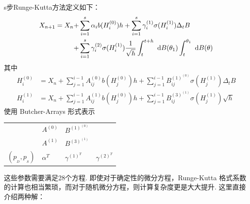 s步Runge-Kutta方法定义如下：
\begin{equation}\label{kutta}
\begin{aligned}
X_{n+1} = X_n + & \sum_{i=1}^s \alpha_i b(H_i^{(0)}) h + \sum_{i=1}^s\gamma_i^{(1)} \sigma(H_i^{(1)})\Delta_tB \\
+ & \sum_{i=1}^s \gamma_i^{(2)} \sigma(H_i^{(1)})\frac1{\sqrt h} \int_t^{t+h}\text{ d} B(\theta_1) \int_t^{\theta_1} \text{ d} B(\theta)
\end{aligned}
\end{equation}
其中
\[
\begin{aligned}
H_{i}^{(0)} &=X_{n}+\sum_{j=1}^{i-1} A_{i j}^{(0)} b\left(H_{j}^{(0)}\right) h+\sum_{j=1}^{i-1} B_{i j}^{(1)^{(0)}} \sigma\left(H_{j}^{(1)}\right) \Delta_tB \\
H_{i}^{(1)} &=X_{n}+\sum_{j=1}^{i-1} A_{i j}^{(1)} b\left(H_{j}^{(0)}\right) h+\sum_{j=1}^{i-1} B_{i j}^{(3)^{(1)}} \sigma\left(H_{j}^{(1)}\right) \sqrt{h}
\end{aligned}
\]
使用 Butcher-Arrays 形式表示 
\begin{table}[!htbp]
\centering
\begin{tabular}{p{1cm}<{\centering} | p{2cm}<{\centering} | p{2cm}<{\centering} |p{2cm}<{\centering}}
	\multirow{2}{*}{} & $A^{(0)}$ & $B^{(1)^{(0)}}$ & \\
	\cline{2-4}
	\rule{0pt}{13pt} & $A^{(1)}$ & $B^{(3)^{(1)}}$ & \\
	\hline
	\rule{0pt}{15pt} $(p_{_D} , p_{_S})$& $\alpha^T$ & $\gamma^{(1)^T}$ & $\gamma^{(2)^T}$\\
\end{tabular}
\end{table}
这些参数需要满足28个方程\cite{book_kutta}. 
即使对于确定性的微分方程，Runge-Kutta 格式系数的计算也相当繁琐，而对于随机微分方程，则计算复杂度更是大大提升. 
这里直接介绍两种解：
